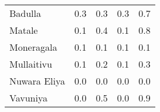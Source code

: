 \begin{tabular}{lrrrr}
Badulla      &            0.3 &                 0.3 &            0.3 &                 0.7 \\
Matale       &            0.1 &                 0.4 &            0.1 &                 0.8 \\
Moneragala   &            0.1 &                 0.1 &            0.1 &                 0.1 \\
Mullaitivu   &            0.1 &                 0.2 &            0.1 &                 0.3 \\
Nuwara Eliya &            0.0 &                 0.0 &            0.0 &                 0.0 \\
Vavuniya     &            0.0 &                 0.5 &            0.0 &                 0.9 \\
\bottomrule
\end{tabular}
